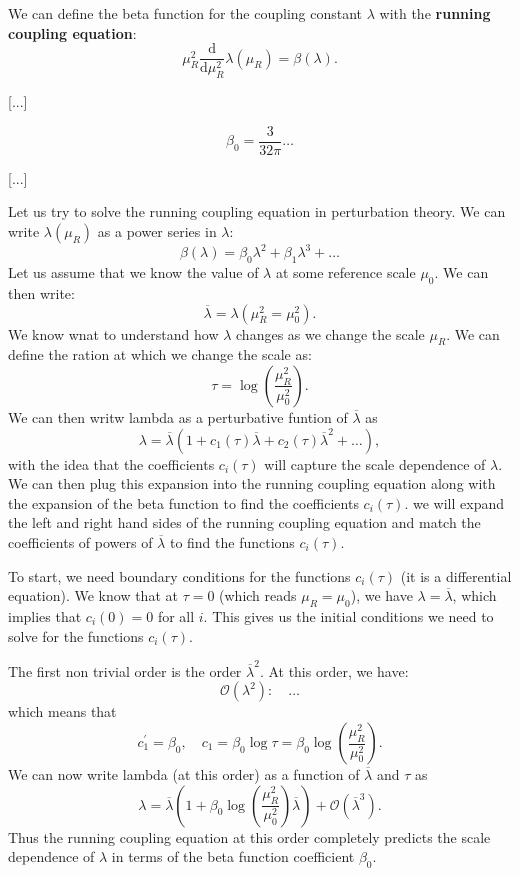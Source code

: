 We can define the beta function for the coupling constant $\lambda$ with the \textbf{running coupling equation}:
\[
    \mu_R^2 \frac{\mathrm{d}}{\mathrm{d} \mu_R^2} \lambda(\mu_R) = \beta(\lambda).
\]

[...]

\[
    \beta_0 = \frac{3}{32 \pi}\dots
\]

[...]

Let us try to solve the running coupling equation in perturbation theory. We can write $\lambda(\mu_R)$ as a power series in $\lambda$:
\[
    \beta(\lambda) = \beta_0 \lambda^2 + \beta_1 \lambda^3 + \dots
\]
Let us assume that we know the value of $\lambda$ at some reference scale $\mu_0$. We can then write:
\[
    \overline{\lambda} = \lambda(\mu_R^2 = \mu_0^2).
\]
We know wnat to understand how $\lambda$ changes as we change the scale $\mu_R$. We can define the ration at which we change the scale as:
\[
    \tau = \log \left( \frac{\mu_R^2}{\mu_0^2} \right).
\]
We can then writw lambda as a perturbative funtion of \(\overline{\lambda}\) as
\[
    \lambda = \overline{\lambda}\left( 1 + c_1(\tau) \overline{\lambda} + c_2(\tau) \overline{\lambda}^2 + \dots \right),
\]
with the idea that the coefficients \(c_i(\tau)\) will capture the scale dependence of \(\lambda\). We can then plug this expansion into the running coupling equation along with the expansion of the beta function to find the coefficients \(c_i(\tau)\). we will expand the left and right hand sides of the running coupling equation and match the coefficients of powers of \(\overline{\lambda}\) to find the functions \(c_i(\tau)\).

To start, we need boundary conditions for the functions \(c_i(\tau)\) (it is a differential equation). We know that at \(\tau = 0\) (which reads \(\mu_R = \mu_0\)), we have \(\lambda = \overline{\lambda}\), which implies that \(c_i(0) = 0\) for all \(i\). This gives us the initial conditions we need to solve for the functions \(c_i(\tau)\).

The first non trivial order is the order \(\overline{\lambda}^2\). At this order, we have:
\[
    \mathcal{O}(\lambda^2): \quad \dots
\]
which means that
\[
    c_1^{\prime} = \beta_0, \quad c_1 = \beta_0 \log \tau = \beta_0 \log \left( \frac{\mu_R^2}{\mu_0^2} \right).
\]
We can now write lambda (at this order) as a function of \(\overline{\lambda}\) and \(\tau\) as
\[
    \lambda = \overline{\lambda}\left( 1 + \beta_0 \log \left( \frac{\mu_R^2}{\mu_0^2} \right) \overline{\lambda} \right) + \mathcal{O} \left( \overline{\lambda}^3 \right).
\]
Thus the running coupling equation at this order completely predicts the scale dependence of \(\lambda\) in terms of the beta function coefficient \(\beta_0\).

